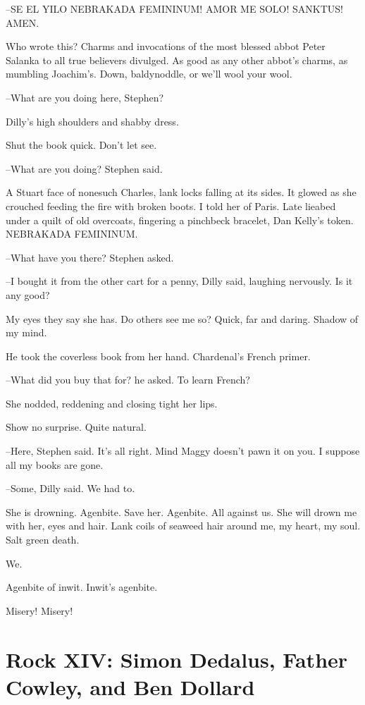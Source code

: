 --SE EL YILO NEBRAKADA FEMININUM!
AMOR ME SOLO!
SANKTUS!
AMEN.

Who wrote this?
Charms and invocations of the most blessed abbot Peter Salanka
to all true believers divulged.
As good as any other abbot's
charms,
as mumbling Joachim's.
Down, baldynoddle, or we'll wool your
wool.

--What are you doing here, Stephen?

Dilly's high shoulders and shabby dress.

Shut the book quick.
Don't let see.

--What are you doing?
Stephen said.

A Stuart face of nonesuch Charles,
lank locks falling at its sides.
It glowed as she crouched
feeding the fire with broken boots.
I told her of Paris.
Late lieabed under a quilt of old overcoats,
fingering a pinchbeck bracelet,
Dan Kelly's token.
NEBRAKADA FEMININUM.

--What have you there?
Stephen asked.

--I bought it from the other cart for a penny,
Dilly said,
laughing
nervously.
Is it any good?

My eyes they say she has.
Do others see me so?
Quick, far and daring.
Shadow of my mind.

He took the coverless book from her hand.
Chardenal's French primer.

--What did you buy that for?
he asked.
To learn French?

She nodded,
reddening and closing tight her lips.

Show no surprise. Quite natural.

--Here,
Stephen said.
It's all right.
Mind Maggy doesn't pawn it on you.
I suppose all my books are gone.

--Some,
Dilly said.
We had to.

She is drowning.
Agenbite.
Save her.
Agenbite.
All against us.
She will
drown me with her,
eyes and hair.
Lank coils of seaweed hair around me,
my heart, my soul.
Salt green death.

We.

Agenbite of inwit.
Inwit's agenbite.

Misery!
Misery!


\section*{Rock XIV: Simon Dedalus, Father Cowley, and Ben Dollard}


